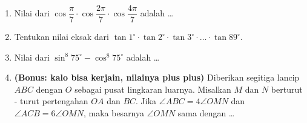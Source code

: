 \documentclass[12pt]{scrartcl}
\begin{document}
\begin{enumerate}
    \item Nilai dari $\cos \dfrac{\pi}{7}\cdot \cos \dfrac{2\pi}{7} \cdot \cos \dfrac{4\pi}{7}$ adalah \dots

    \item Tentukan nilai eksak dari $\tan 1^\circ \cdot \tan 2^\circ \cdot \tan 3^\circ \cdot \ldots \cdot \tan 89^\circ$.

    \item Nilai dari $\sin^8 75^\circ - \cos^8 75^\circ$ adalah \dots

    \item \textbf{(Bonus: kalo bisa kerjain, nilainya plus plus)}  Diberikan segitiga lancip $ABC$ dengan $O$ sebagai pusat lingkaran luarnya. Misalkan $M$ dan $N$ berturut - turut pertengahan $OA$ dan $BC$. Jika $\angle ABC = 4\angle OMN$ dan $\angle ACB = 6\angle OMN$, maka besarnya $\angle OMN$ sama dengan \dots
\end{enumerate}
\end{document}
